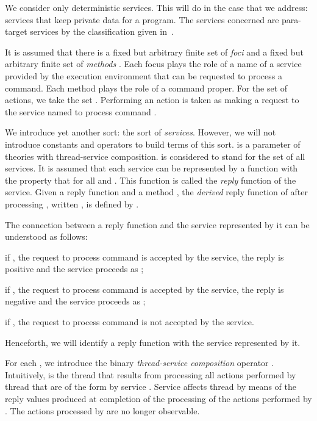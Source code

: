 \documentclass[fleqn]{llncs}
\begin{document}
We consider only deterministic services.
This will do in the case that we address: services that keep private
data for a program.
The services concerned are para-target services by the classification
given in~\cite{BM07a}.

It is assumed that there is a fixed but arbitrary finite set of
\emph{foci}  and a fixed but arbitrary finite set of
\emph{methods} .
Each focus plays the role of a name of a service provided by the
execution environment that can be requested to process a command.
Each method plays the role of a command proper.
For the set  of actions, we take the set
.
Performing an action  is taken as making a request to the
service named  to process command .

We introduce yet another sort: the sort  of \emph{services}.
However, we will not introduce constants and operators to build terms
of this sort.
 is a parameter of theories with thread-service composition.
 is considered to stand for the set of all services.
It is assumed that each service can be represented by a function
 with the
property that
 for
all  and .
This function is called the \emph{reply} function of the service.
Given a reply function  and a method , the
\emph{derived} reply function of  after processing , written
, is defined by
.

The connection between a reply function  and the service represented
by it can be understood as follows:
\begin{iteml}
\item
if , the request to process command  is accepted
by the service, the reply is positive and the service proceeds as
;
\item
if , the request to process command  is accepted
by the service, the reply is negative and the service proceeds as
;
\item
if , the request to process command  is
not accepted by the service.
\end{iteml}
Henceforth, we will identify a reply function with the service
represented by it.

For each , we introduce the binary \emph{thread-service
composition} operator .
Intuitively,  is the thread that results from processing
all actions performed by thread  that are of the form  by
service .
Service  affects thread  by means of the reply values produced at
completion of the processing of the actions performed by .
The actions processed by  are no longer observable.
\end{document}
